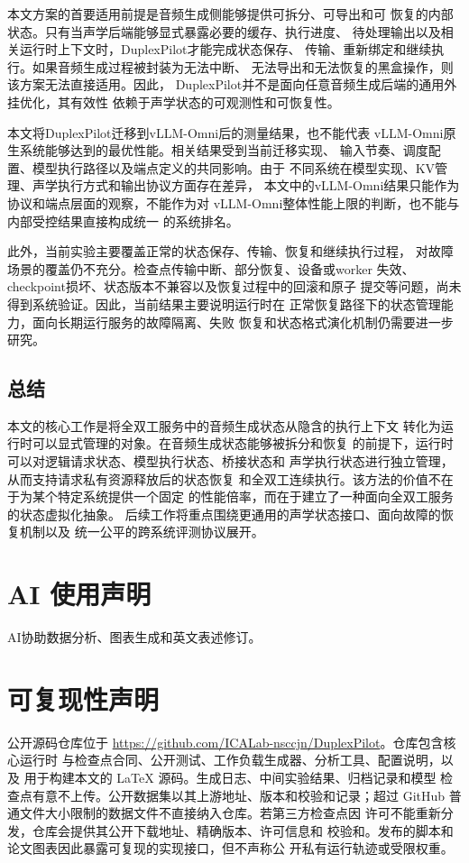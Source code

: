 \documentclass{article}
\begin{document}
本文方案的首要适用前提是音频生成侧能够提供可拆分、可导出和可
恢复的内部状态。只有当声学后端能够显式暴露必要的缓存、执行进度、
待处理输出以及相关运行时上下文时，DuplexPilot才能完成状态保存、
传输、重新绑定和继续执行。如果音频生成过程被封装为无法中断、
无法导出和无法恢复的黑盒操作，则该方案无法直接适用。因此，
DuplexPilot并不是面向任意音频生成后端的通用外挂优化，其有效性
依赖于声学状态的可观测性和可恢复性。

本文将DuplexPilot迁移到vLLM-Omni后的测量结果，也不能代表
vLLM-Omni原生系统能够达到的最优性能。相关结果受到当前迁移实现、
输入节奏、调度配置、模型执行路径以及端点定义的共同影响。由于
不同系统在模型实现、KV管理、声学执行方式和输出协议方面存在差异，
本文中的vLLM-Omni结果只能作为协议和端点层面的观察，不能作为对
vLLM-Omni整体性能上限的判断，也不能与内部受控结果直接构成统一
的系统排名。

此外，当前实验主要覆盖正常的状态保存、传输、恢复和继续执行过程，
对故障场景的覆盖仍不充分。检查点传输中断、部分恢复、设备或worker
失效、checkpoint损坏、状态版本不兼容以及恢复过程中的回滚和原子
提交等问题，尚未得到系统验证。因此，当前结果主要说明运行时在
正常恢复路径下的状态管理能力，面向长期运行服务的故障隔离、失败
恢复和状态格式演化机制仍需要进一步研究。

\subsection{总结}
\label{sec:conclusion}

本文的核心工作是将全双工服务中的音频生成状态从隐含的执行上下文
转化为运行时可以显式管理的对象。在音频生成状态能够被拆分和恢复
的前提下，运行时可以对逻辑请求状态、模型执行状态、桥接状态和
声学执行状态进行独立管理，从而支持请求私有资源释放后的状态恢复
和全双工连续执行。该方法的价值不在于为某个特定系统提供一个固定
的性能倍率，而在于建立了一种面向全双工服务的状态虚拟化抽象。
后续工作将重点围绕更通用的声学状态接口、面向故障的恢复机制以及
统一公平的跨系统评测协议展开。

\section*{AI 使用声明}
AI协助数据分析、图表生成和英文表述修订。

\section*{可复现性声明}
公开源码仓库位于
\url{https://github.com/ICALab-nsccjn/DuplexPilot}。仓库包含核心运行时
与检查点合同、公开测试、工作负载生成器、分析工具、配置说明，以及
用于构建本文的 LaTeX 源码。生成日志、中间实验结果、归档记录和模型
检查点有意不上传。公开数据集以其上游地址、版本和校验和记录；超过
GitHub 普通文件大小限制的数据文件不直接纳入仓库。若第三方检查点因
许可不能重新分发，仓库会提供其公开下载地址、精确版本、许可信息和
校验和。发布的脚本和论文图表因此暴露可复现的实现接口，但不声称公
开私有运行轨迹或受限权重。




\clearpage
\appendix

\end{document}
